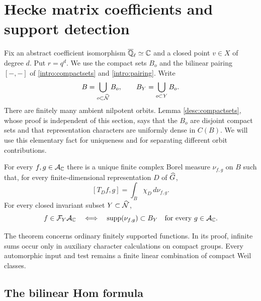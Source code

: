 \section{Hecke matrix coefficients and support detection}
\label{meas:section}

Fix an abstract coefficient isomorphism $\overline{\mathbb Q}_{\ell}\simeq\mathbb C$ and a closed point
$v\in X$ of degree $d$.  Put $r=q^d$.  We use the compact sets $B_o$ and
the bilinear pairing $[-,-]$ of \eqref{intro:compactsets} and
\eqref{intro:pairing}.  Write
\[
 B=\bigcup_{o\subset\widehat{\mathcal N}}B_o,
 \qquad B_Y=\bigcup_{o\subset Y}B_o.
\]
There are finitely many ambient nilpotent orbits.  Lemma
\ref{desc:compactsets}, whose proof is independent of this section, says
that the $B_o$ are disjoint compact sets and that representation characters
are uniformly dense in $C(B)$.  We will use this elementary fact for
uniqueness and for separating different orbit contributions.

\begin{theorem}\label{meas:detector}
For every $f,g\in\mathcal A_{\mathbb C}$ there is a unique finite complex Borel measure
$\nu_{f,g}$ on $B$ such that, for every finite-dimensional representation
$D$ of $\widehat G$,
\begin{equation}\label{meas:moments}
 [T_Df,g]=\int_B\chi_D\,d\nu_{f,g}.
\end{equation}
For every closed invariant subset $Y\subset\widehat{\mathcal N}$,
\begin{equation}\label{meas:criterion}
 f\in\mathcal F_Y\mathcal A_{\mathbb C}
 \quad\Longleftrightarrow\quad
 \operatorname{supp}(\nu_{f,g})\subset B_Y
 \quad\text{for every }g\in\mathcal A_{\mathbb C}.
\end{equation}
\end{theorem}

The theorem concerns ordinary finitely supported functions.  In its proof,
infinite sums occur only in auxiliary character calculations on compact
groups.  Every automorphic input and test remains a finite linear
combination of compact Weil classes.

\subsection{The bilinear Hom formula}

